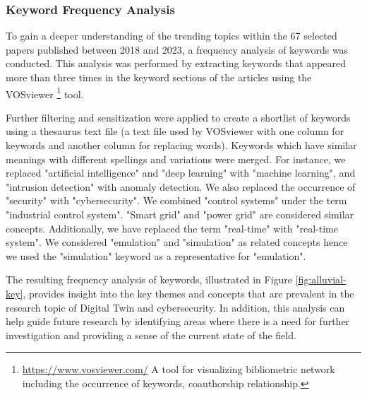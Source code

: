 \subsubsection*{Keyword Frequency Analysis}
To gain a deeper understanding of the trending topics within the 67 selected papers published between 2018 and 2023, a frequency analysis of keywords was conducted. This analysis was performed by extracting keywords that appeared more than three times in the keyword sections of the articles using the VOSviewer \footnote{\url{https://www.vosviewer.com/} A tool for visualizing bibliometric network including the occurrence of keywords, coauthorship relationship.} tool. 

Further filtering and sensitization were applied to create a shortlist of keywords using a thesaurus text file (a text file used by VOSviewer with one column for keywords and another column for replacing words). Keywords which have similar meanings with different spellings and variations were merged. For instance, we replaced "artificial intelligence" and "deep learning" with "machine learning", and "intrusion detection" with anomaly detection. We also replaced the occurrence of "security" with "cybersecurity". We combined "control systems" under the term "industrial control system". "Smart grid" and "power grid" are considered similar concepts. Additionally, we have replaced the term "real-time" with "real-time system". We considered "emulation" and "simulation" as related concepts hence we used the "simulation" keyword as a representative for "emulation". 

The resulting frequency analysis of keywords, illustrated in Figure \ref{fig:alluvial-key}, provides insight into the key themes and concepts that are prevalent in the research topic of Digital Twin and cybersecurity. In addition, this analysis can help guide future research by identifying areas where there is a need for further investigation and providing a sense of the current state of the field.

